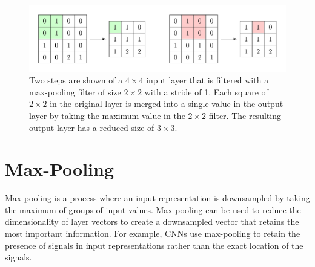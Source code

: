 \documentclass[10pt,twocolumn,letterpaper]{article}
\begin{document}
%











\begin{figure}[t]
\begin{center}
\includegraphics[width=1.0\textwidth]{images/max-pooling}
\end{center}
\caption{Two steps are shown of a $4\times 4$ input layer that is filtered with a max-pooling filter of size $2\times 2$ with a stride of 1. Each square of $2\times 2$ in the original layer is merged into a single value in the output layer by taking the maximum value in the $2\times 2 $ filter. The resulting output layer has a reduced size of $3\times 3$.}
\label{max-pooling}
\end{figure}




\section{Max-Pooling}

Max-pooling is a process where an input representation is downsampled by taking the maximum of groups of input values. 
Max-pooling can be used to reduce the dimensionality of layer vectors to create a downsampled vector that retains the most important information. 
For example, CNNs use max-pooling to retain the presence of signals in input representations rather than the exact location of the signals. 
\end{document}
